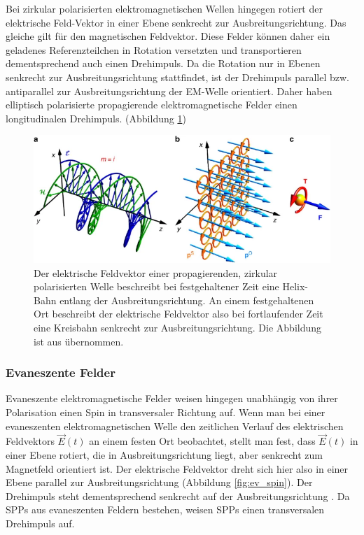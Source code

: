 \documentclass[a4paper, titlepage,  ngerman]{book}
\begin{document}
	Bei zirkular polarisierten elektromagnetischen Wellen hingegen rotiert der elektrische Feld-Vektor in einer Ebene senkrecht zur Ausbreitungsrichtung. Das gleiche gilt für den magnetischen Feldvektor. Diese Felder können daher ein geladenes Referenzteilchen in Rotation versetzten und transportieren dementsprechend auch einen Drehimpuls. Da die Rotation nur in Ebenen senkrecht zur Ausbreitungsrichtung stattfindet, ist der Drehimpuls parallel bzw. antiparallel zur Ausbreitungsrichtung der EM-Welle orientiert. Daher haben elliptisch polarisierte propagierende elektromagnetische Felder einen longitudinalen Drehimpuls. (Abbildung \ref{fig:prop_spin})
	
	\begin{figure}
		\centering
		\includegraphics[width=0.7\linewidth]{figures/spin/prop_spin}
		\caption[Drehimpuls von propagierender EM-Welle]{Der elektrische Feldvektor einer propagierenden, zirkular polarisierten Welle beschreibt bei festgehaltener Zeit eine Helix-Bahn entlang der Ausbreitungsrichtung. An einem festgehaltenen Ort beschreibt der elektrische Feldvektor also bei fortlaufender Zeit eine Kreisbahn senkrecht zur Ausbreitungsrichtung. Die Abbildung ist aus \cite{Bliokh.2014} übernommen.}
		\label{fig:prop_spin}
	\end{figure}
	
	\subsubsection{Evaneszente Felder}	
	Evaneszente elektromagnetische Felder weisen hingegen unabhängig von ihrer Polarisation einen Spin in transversaler Richtung auf. Wenn man bei einer evaneszenten elektromagnetischen Welle den zeitlichen Verlauf des elektrischen Feldvektors $\vec{E}(t)$ an einem festen Ort beobachtet, stellt man fest, dass $\vec{E}(t)$ in einer Ebene rotiert, die in Ausbreitungsrichtung liegt, aber senkrecht zum Magnetfeld orientiert ist. Der elektrische Feldvektor dreht sich hier also in einer Ebene parallel zur Ausbreitungsrichtung (Abbildung \ref{fig:ev_spin}). Der Drehimpuls steht dementsprechend senkrecht auf der Ausbreitungsrichtung \cite{Bliokh.2014}. Da SPPs aus evaneszenten Feldern bestehen, weisen SPPs einen transversalen Drehimpuls auf. 
	
\end{document}
